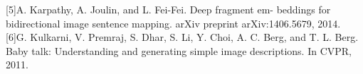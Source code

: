 \documentclass[12pt]{article}%
\begin{document}
%
%
%
%
%

[5]A. Karpathy, A. Joulin, and L. Fei-Fei. Deep fragment em- beddings for bidirectional image sentence mapping. arXiv preprint arXiv:1406.5679, 2014.\\

%
%
%

[6]G. Kulkarni, V. Premraj, S. Dhar, S. Li, Y. Choi, A. C. Berg, and T. L. Berg. Baby talk: Understanding and generating simple image descriptions. In CVPR, 2011.\\
\end{document}
